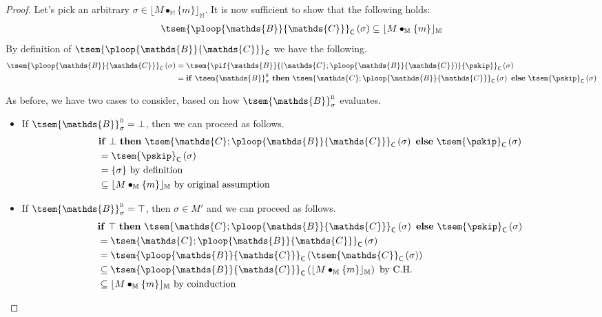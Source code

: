 {\begin{proof}
Let's pick an arbitrary $\sigma \in \lfloor M \bullet_\mathbb{M} \{m\} \rfloor_\mathbb{M}$. It is now sufficient to show that the following holds:
\begin{gather}
	\tsem{\ploop{\mathds{B}}{\mathds{C}}}_\mathsf{C} \left( \sigma \right) \subseteq \lfloor M \bullet_\mathbb{M} \{m\} \rfloor_\mathbb{M}
\end{gather}
By definition of $\tsem{\ploop{\mathds{B}}{\mathds{C}}}_\mathsf{C}$ we have the following.
\begin{align*}
	\tsem{\ploop{\mathds{B}}{\mathds{C}}}_\mathsf{C} \left( \sigma \right)
	&=
	\tsem{\pif{\mathds{B}}{\left(\mathds{C};\ploop{\mathds{B}}{\mathds{C}}\right)}{\pskip}}_\mathsf{C} \left( \sigma \right) \\
	&=
	\mathbf{if}\ \tsem{\mathds{B}}^\textsc{b}_\sigma\ \mathbf{then}\ \tsem{\mathds{C};\ploop{\mathds{B}}{\mathds{C}}}_\mathsf{C}\left( \sigma \right)\ \mathbf{else}\ \tsem{\pskip}_\mathsf{C}\left( \sigma \right)
\end{align*}

As before, we have two cases to consider, based on how $\tsem{\mathds{B}}_\sigma^\textsc{b}$ evaluates.
\begin{itemize}
	\item If $\tsem{\mathds{B}}_\sigma^\textsc{b} = \bot$, then we can proceed as follows.
		\begin{align*}
			&\mathbf{if}\ \bot\ \mathbf{then}\ \tsem{\mathds{C};\ploop{\mathds{B}}{\mathds{C}}}_\mathsf{C}\left( \sigma \right)\ \mathbf{else}\ \tsem{\pskip}_\mathsf{C}\left( \sigma \right)
			\\
			&= \tsem{\pskip}_\mathsf{C}\left( \sigma \right)
			\\
			&= \{ \sigma \} \text{ by definition}
			\\
			&\subseteq \lfloor M \bullet_\mathbb{M} \{m\} \rfloor_\mathbb{M} \text{ by original assumption}
		\end{align*}
		
	\item If $\tsem{\mathds{B}}_\sigma^\textsc{b} = \top$, then $\sigma \in M'$ and we can proceed as follows.
		\begin{align*}
			&\mathbf{if}\ \top\ \mathbf{then}\ \tsem{\mathds{C};\ploop{\mathds{B}}{\mathds{C}}}_\mathsf{C}\left( \sigma \right)\ \mathbf{else}\ \tsem{\pskip}_\mathsf{C}\left( \sigma \right)
			\\
			&= \tsem{\mathds{C};\ploop{\mathds{B}}{\mathds{C}}}_\mathsf{C}\left( \sigma \right)
			\\
			&= \tsem{\ploop{\mathds{B}}{\mathds{C}}}_\mathsf{C} \left( \tsem{\mathds{C}}_\mathsf{C}\left( \sigma \right) \right)
			\\
			&\subseteq \tsem{\ploop{\mathds{B}}{\mathds{C}}}_\mathsf{C} \left( \lfloor M \bullet_\mathbb{M} \{m\} \rfloor_\mathbb{M} \right) \text{ by C.H.}
			\\
			&\subseteq \lfloor M \bullet_\mathbb{M} \{m\} \rfloor_\mathbb{M} \text{ by coinduction}
		\end{align*}
\end{itemize}
\end{proof}
}

